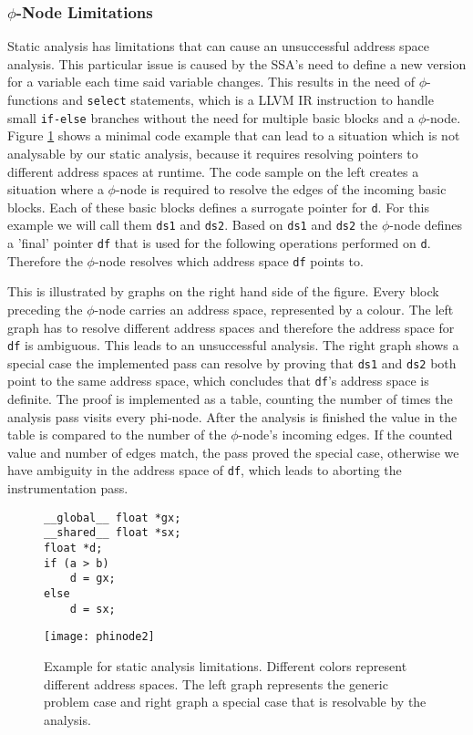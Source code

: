 \subsubsection{$\phi$-Node Limitations}\label{patho}
Static analysis has limitations that can cause an unsuccessful address space analysis. This particular issue is caused by the SSA's need to define a new version for a variable each time said variable changes. This results in the need of $\phi$-functions and \verb|select| statements, which is a LLVM IR instruction to handle small \verb|if-else| branches without the need for multiple basic blocks
and a $\phi$-node. Figure \ref{phinodes} shows a minimal code example that can lead to a situation which is not analysable by our static analysis, because it requires resolving pointers to different address spaces at runtime. The code sample on the left creates a situation where a $\phi$-node is required to resolve the edges of the incoming basic blocks. Each of these basic blocks defines a surrogate pointer for \verb|d|. For this example we will call them \verb|ds1| and \verb|ds2|. Based on \verb|ds1| and \verb|ds2| the $\phi$-node defines a 'final' pointer \verb|df| that is used for the following operations performed on \verb|d|. Therefore the $\phi$-node resolves which address space \verb|df| points to. 

This is illustrated by graphs on the right hand side of the figure. Every block preceding the $\phi$-node carries an address space, represented by a colour.
The left graph has to resolve different address spaces and therefore the address space for \verb|df| is ambiguous. This leads to an unsuccessful analysis. The right graph shows a special case the implemented pass can resolve by proving that \verb|ds1| and \verb|ds2| both point to the same address space, which concludes that \verb|df|'s address space is definite. The proof is implemented as a table, counting the number of times the analysis pass visits every phi-node. After the analysis is finished the value in the table is compared to the number of the $\phi$-node's incoming edges. If the counted value and number of edges match, the pass proved the special case, otherwise we have ambiguity in the address space of \verb|df|, which leads to aborting the instrumentation pass.

\begin{figure}[t]
		\begin{minipage}{0.35\textwidth}

		\begin{lstlisting}[style=c]
__global__ float *gx;
__shared__ float *sx;
float *d;
if (a > b)
	d = gx;
else 
	d = sx;	\end{lstlisting}
			\end{minipage}\hfill
	\begin{minipage}{0.6\textwidth}
		\centering
		\texttt{[image: phinode2]}
	\end{minipage}\hfill
	\caption[$\phi$-node Limitations]{Example for static analysis limitations. Different colors represent different address spaces. The left graph represents the generic problem case and right graph a special case that is resolvable by the analysis.}
	\label{phinodes}
\end{figure}

